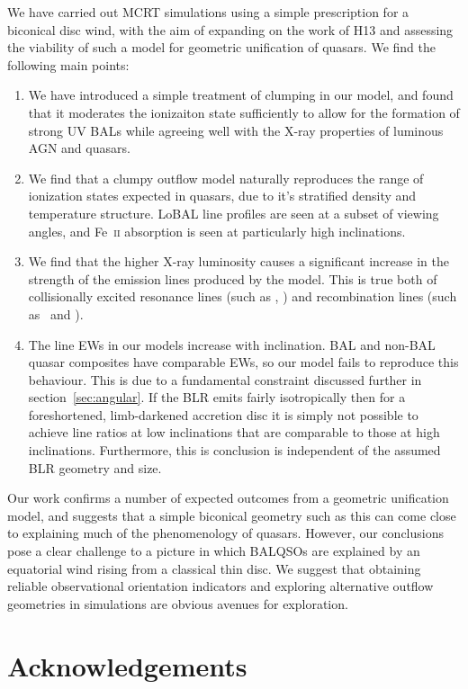 \documentclass[useAMS,usenatbib]{mn2e_x}
\begin{document}
We have carried out MCRT simulations using a simple
prescription for a biconical disc wind, with
the aim of expanding on the work of H13 and assessing 
the viability of such a model for geometric unification of quasars.
We find the following main points:
\begin{enumerate}
\item We have introduced a simple treatment 
of clumping in our model, and found that it moderates the ionizaiton state
sufficiently to allow for the 
formation of strong UV BALs while agreeing well with the X-ray
properties of luminous AGN and quasars. 
\smallskip
\item We find that a clumpy outflow model naturally 
reproduces the range of ionization states
expected in quasars, due to it's stratified density
and temperature structure. 
LoBAL line profiles are seen at a subset of viewing angles, and Fe~\textsc{ii}
absorption is seen at particularly high inclinations.
\smallskip
\item We find that the higher X-ray luminosity 
causes a significant 
increase in the strength of the  emission
lines produced by the model. This is true both
of collisionally excited resonance lines (such as \civ, \nv)
and recombination lines (such as \la\ and \heiiline).
\smallskip
\item The line EWs in our models increase with inclination.
BAL and non-BAL quasar composites have comparable EWs, so our model
fails to reproduce this behaviour.
This is due to a fundamental constraint discussed further in 
section~\ref{sec:angular}. If the BLR emits fairly isotropically then for a 
foreshortened, limb-darkened accretion disc 
it is simply not possible to achieve line ratios at low inclinations 
that are comparable to those at high inclinations. 
Furthermore, this is conclusion is independent of the assumed 
BLR geometry and size.
\end{enumerate}
Our work confirms a number of expected outcomes from a geometric unification 
model, and suggests that a simple biconical geometry such as this can come close to 
explaining much of the  phenomenology of quasars. However, our conclusions pose 
a clear challenge to a picture in which BALQSOs are
explained by an equatorial wind rising from a classical thin disc. 
We suggest that obtaining reliable observational orientation indicators and 
exploring alternative outflow geometries in simulations
are obvious avenues for exploration.


\section*{Acknowledgements}
\end{document}
